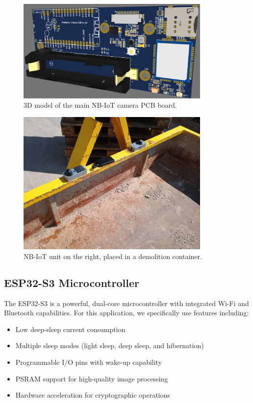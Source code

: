 \documentclass[11pt,a4paper]{article}
\begin{document}
\begin{figure}[h]
\centering
\includegraphics[width=0.85\textwidth]{tex_photos/nbiotcam_board.png}
\caption{3D model of the main NB-IoT camera PCB board.}
\label{fig:nbiotcam-board}
\end{figure}

\begin{figure}[h]
\centering
\includegraphics[width=0.85\textwidth]{tex_photos/5956168425011267555.jpg}
\caption{NB-IoT unit on the right, placed in a demolition container.}
\label{fig:nbiot-container}
\end{figure}

\subsection{ESP32-S3 Microcontroller}

The ESP32-S3 is a powerful, dual-core microcontroller with integrated Wi-Fi and Bluetooth capabilities. For this application, we specifically use features including:

\begin{itemize}
    \item Low deep-sleep current consumption
    \item Multiple sleep modes (light sleep, deep sleep, and hibernation)
    \item Programmable I/O pins with wake-up capability
    \item PSRAM support for high-quality image processing
    \item Hardware acceleration for cryptographic operations
\end{itemize}
\end{document}
